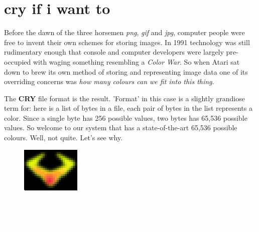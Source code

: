 \chapter{cry if i want to} 
\label{sec:listing}
\lstset{style=6502Style}
Before the dawn of the three horsemen \textit{png}, \textit{gif} and \textit{jpg}, computer people were free to invent their 
own schemes for storing images. In 1991 technology was still
rudimentary enough that console and computer developers were largely pre-occupied with waging something resembling a \textit{Color War}. So
when Atari sat down to brew its own method of storing and representing image data one of its overriding concerns was \textit{how many
colours can we fit into this thing}.

The \textbf{CRY} file format is the result. 'Format' in this case is a slightly grandiose term for: here is a list of bytes in a file,
each pair of bytes in the list represents a color. Since a single byte has 256 possible values, two bytes has 65,536 possible values.
So welcome to our system that has a state-of-the-art 65,536 possible colours. Well, not quite. Let's see why.

\begin{definition}
\setlength{\intextsep}{0pt}%
\setlength{\columnsep}{3pt}%
\begin{figure}
\includegraphics[width=\linewidth]{src/callout/claw.png} 
\end{figure}
\small
\textcolor{white}{
Good luck figuring out what CRY is an acryonym of. Maybe it refers to the three axes of the 'colour space': cyan, red, and yellow. 
Maybe it refers to the three components contained in each byte pair: color, radiance, and luminosity?
}
\end{definition}

